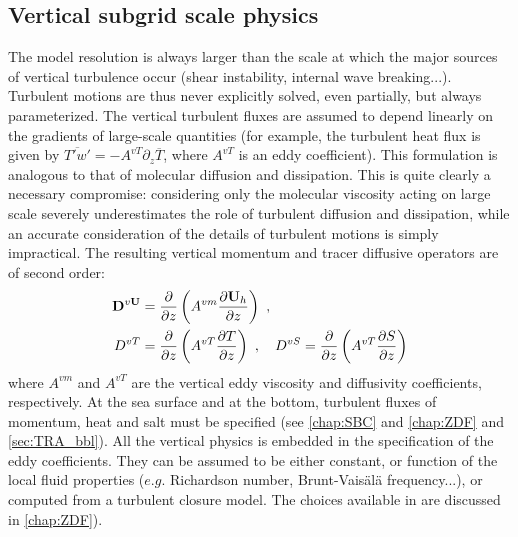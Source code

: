 \documentclass[../main/NEMO_manual]{subfiles}
\begin{document}
\subsection{Vertical subgrid scale physics}
\label{subsec:PE_zdf}

The model resolution is always larger than the scale at which the major sources of vertical turbulence occur
(shear instability, internal wave breaking...).
Turbulent motions are thus never explicitly solved, even partially, but always parameterized.
The vertical turbulent fluxes are assumed to depend linearly on the gradients of large-scale quantities
(for example, the turbulent heat flux is given by $\overline{T'w'}=-A^{vT} \partial_z \overline T$,
where $A^{vT}$ is an eddy coefficient).
This formulation is analogous to that of molecular diffusion and dissipation.
This is quite clearly a necessary compromise: considering only the molecular viscosity acting on
large scale severely underestimates the role of turbulent diffusion and dissipation,
while an accurate consideration of the details of turbulent motions is simply impractical.
The resulting vertical momentum and tracer diffusive operators are of second order:
\begin{equation}
  \label{eq:PE_zdf}
  \begin{split}
    {\ensuremath{\mathbf{D}}}^{v \mathbf{U}} &=\frac{\partial }{\partial z}\left( {A^{vm}\frac{\partial {\ensuremath{\mathbf{U}}}_h }{\partial z}} \right) \ , \\
    D^{vT}                         &= \frac{\partial }{\partial z}\left( {A^{vT}\frac{\partial T}{\partial z}} \right) \ ,
    \quad
    D^{vS}=\frac{\partial }{\partial z}\left( {A^{vT}\frac{\partial S}{\partial z}} \right)
  \end{split}
\end{equation}
where $A^{vm}$ and $A^{vT}$ are the vertical eddy viscosity and diffusivity coefficients, respectively.
At the sea surface and at the bottom, turbulent fluxes of momentum, heat and salt must be specified
(see \autoref{chap:SBC} and \autoref{chap:ZDF} and \autoref{sec:TRA_bbl}).
All the vertical physics is embedded in the specification of the eddy coefficients.
They can be assumed to be either constant, or function of the local fluid properties
($e.g.$ Richardson number, Brunt-Vais\"{a}l\"{a} frequency...),
or computed from a turbulent closure model.
The choices available in \NEMO are discussed in \autoref{chap:ZDF}).

\end{document}
